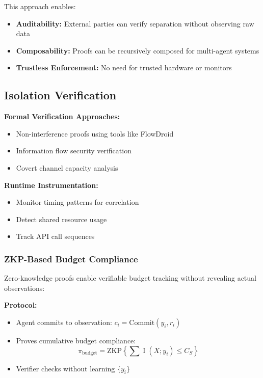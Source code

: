\documentclass[11pt,a4paper]{article}
\theoremstyle{definition}
\DeclareMathOperator{\I}{I}
\begin{document}
This approach enables:

\begin{itemize}
    \item \textbf{Auditability:} External parties can verify separation without observing raw data
    \item \textbf{Composability:} Proofs can be recursively composed for multi-agent systems
    \item \textbf{Trustless Enforcement:} No need for trusted hardware or monitors
\end{itemize}

\subsection{Isolation Verification}

\textbf{Formal Verification Approaches:}

\begin{itemize}
    \item Non-interference proofs using tools like FlowDroid
    \item Information flow security verification
    \item Covert channel capacity analysis
\end{itemize}

\textbf{Runtime Instrumentation:}

\begin{itemize}
    \item Monitor timing patterns for correlation
    \item Detect shared resource usage
    \item Track API call sequences
\end{itemize}

\subsubsection{ZKP-Based Budget Compliance}

Zero-knowledge proofs enable verifiable budget tracking without revealing actual observations:

\textbf{Protocol:}

\begin{itemize}
    \item Agent commits to observation: $c_i = \text{Commit}(y_i, r_i)$
    \item Proves cumulative budget compliance:
    \[
    \pi_{\text{budget}} = \text{ZKP}\left\{\sum \I(X; y_i) \leq C_S\right\}
    \]
    \item Verifier checks without learning $\{y_i\}$
\end{itemize}
\end{document}

